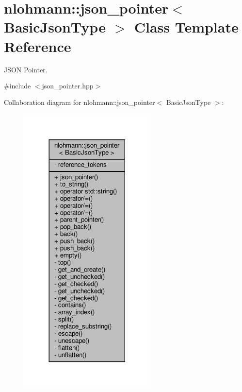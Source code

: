 \hypertarget{classnlohmann_1_1json__pointer}{}\section{nlohmann\+:\+:json\+\_\+pointer$<$ Basic\+Json\+Type $>$ Class Template Reference}
\label{classnlohmann_1_1json__pointer}


J\+S\+ON Pointer.  




{\ttfamily \#include $<$json\+\_\+pointer.\+hpp$>$}



Collaboration diagram for nlohmann\+:\+:json\+\_\+pointer$<$ Basic\+Json\+Type $>$\+:\nopagebreak
\begin{figure}[H]
\begin{center}
\leavevmode
\includegraphics[width=197pt]{classnlohmann_1_1json__pointer__coll__graph}
\end{center}
\end{figure}
